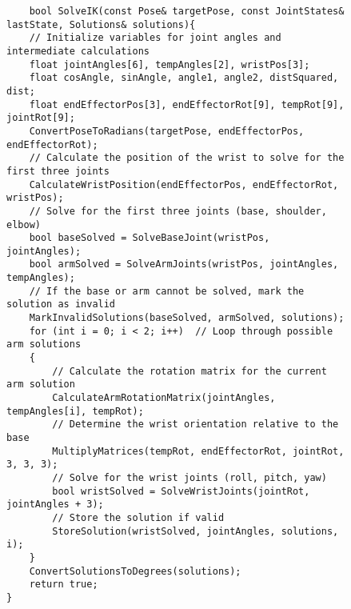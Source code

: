 \begin{figure}[H]
	\centering
	\begin{verbatim}
	bool SolveIK(const Pose& targetPose, const JointStates& lastState, Solutions& solutions){
    // Initialize variables for joint angles and intermediate calculations
    float jointAngles[6], tempAngles[2], wristPos[3];
    float cosAngle, sinAngle, angle1, angle2, distSquared, dist;
    float endEffectorPos[3], endEffectorRot[9], tempRot[9], jointRot[9];
    ConvertPoseToRadians(targetPose, endEffectorPos, endEffectorRot);
    // Calculate the position of the wrist to solve for the first three joints
    CalculateWristPosition(endEffectorPos, endEffectorRot, wristPos);
    // Solve for the first three joints (base, shoulder, elbow)
    bool baseSolved = SolveBaseJoint(wristPos, jointAngles);
    bool armSolved = SolveArmJoints(wristPos, jointAngles, tempAngles);
    // If the base or arm cannot be solved, mark the solution as invalid
    MarkInvalidSolutions(baseSolved, armSolved, solutions);
    for (int i = 0; i < 2; i++)  // Loop through possible arm solutions
    {
        // Calculate the rotation matrix for the current arm solution
        CalculateArmRotationMatrix(jointAngles, tempAngles[i], tempRot);
        // Determine the wrist orientation relative to the base
        MultiplyMatrices(tempRot, endEffectorRot, jointRot, 3, 3, 3);
        // Solve for the wrist joints (roll, pitch, yaw)
        bool wristSolved = SolveWristJoints(jointRot, jointAngles + 3);
        // Store the solution if valid
        StoreSolution(wristSolved, jointAngles, solutions, i);
    }
    ConvertSolutionsToDegrees(solutions);
    return true; 
}
	\end{verbatim}
\end{figure}


